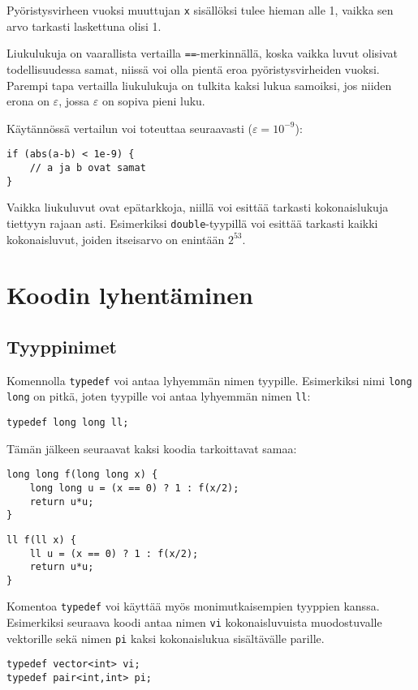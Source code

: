 Pyöristysvirheen vuoksi muuttujan \texttt{x}
sisällöksi tulee hieman alle 1,
vaikka sen arvo tarkasti laskettuna olisi 1.

Liukulukuja on vaarallista vertailla \texttt{==}-merkinnällä,
koska vaikka luvut olisivat todellisuudessa samat,
niissä voi olla pientä eroa pyöristysvirheiden vuoksi.
Parempi tapa vertailla liukulukuja on
tulkita kaksi lukua samoiksi, jos niiden erona on $\varepsilon$,
jossa $\varepsilon$ on sopiva pieni luku.

Käytännössä vertailun voi toteuttaa seuraavasti ($\varepsilon=10^{-9}$):

\begin{lstlisting}
if (abs(a-b) < 1e-9) {
    // a ja b ovat samat
}
\end{lstlisting}

Vaikka liukuluvut ovat epätarkkoja, niillä voi esittää
tarkasti kokonaislukuja tiettyyn rajaan asti.
Esimerkiksi \texttt{double}-tyypillä voi esittää
tarkasti kaikki kokonaisluvut, joiden itseisarvo
on enintään $2^{53}$.
% 

\section{Koodin lyhentäminen}

\subsection{Tyyppinimet}

Komennolla \texttt{typedef} voi antaa lyhyemmän
nimen tyypille.
Esimerkiksi nimi \texttt{long long} on pitkä,
joten tyypille voi antaa lyhyemmän nimen \texttt{ll}:
\begin{lstlisting}
typedef long long ll;
\end{lstlisting}
Tämän jälkeen seuraavat kaksi koodia tarkoittavat samaa:
\begin{lstlisting}
long long f(long long x) {
    long long u = (x == 0) ? 1 : f(x/2);
    return u*u;
}
\end{lstlisting}
\begin{lstlisting}
ll f(ll x) {
    ll u = (x == 0) ? 1 : f(x/2);
    return u*u;
}
\end{lstlisting}
Komentoa \texttt{typedef} voi käyttää myös
monimutkaisempien tyyppien kanssa.
Esimerkiksi seuraava koodi antaa nimen \texttt{vi}
kokonaisluvuista muodostuvalle vektorille
sekä nimen \texttt{pi} kaksi
kokonaislukua sisältävälle parille.
\begin{lstlisting}
typedef vector<int> vi;
typedef pair<int,int> pi;
\end{lstlisting}

